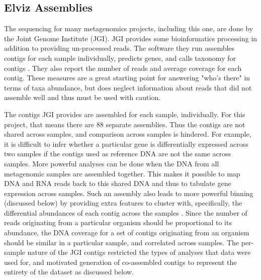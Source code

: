 \subsection{Elviz Assemblies}
The sequencing for many metagenomics projects, including this one, are done by the Joint Genome Institute (JGI).
JGI provides some bioinformatics processing in addition to providing un-processed reads.
The software they run assembles contigs for each sample individually, predicts genes, and calls taxonomy for contigs \cite{cantor2015}.
They also report the number of reads and average coverage for each contig.
These measures are a great starting point for answering "who's there" in terms of taxa abundance, but does neglect information about reads that did not assemble well and thus must be used with caution.

The contigs JGI provides are assembled for each sample, individually.
For this project, that means there are 88 separate assemblies.
Thus the contigs are not shared across samples, and comparison across samples is hindered.
For example, it is difficult to infer whether a particular gene is differentially expressed across two samples if the contigs used as reference DNA are not the same across samples.
More powerful analyses can be done when the DNA from all metagenomic samples are assembled together.
This makes it possible to map DNA and RNA reads back to this shared DNA and thus to tabulate gene expression across samples.
Such an assembly also leads to more powerful binning (discussed below) by providing extra features to cluster with, specifically, the differential abundances of each contig across the samples \cite{albertsen2013}.
Since the number of reads originating from a particular organism should be proportional to its abundance, the DNA coverage for a set of contigs originating from an organism should be similar in a particular sample, and correlated across samples.
The per-sample nature of the JGI contigs restricted the types of analyses that data were used for, and motivated generation of co-assembled contigs to represent the entirety of the dataset as discussed below.

